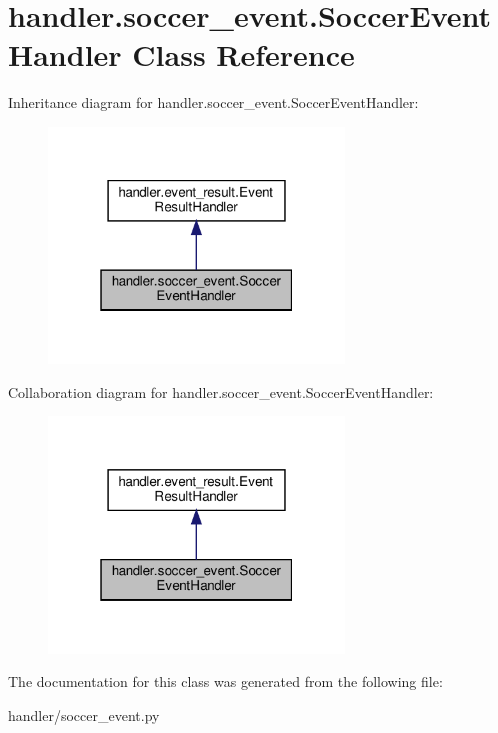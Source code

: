 \hypertarget{classhandler_1_1soccer__event_1_1_soccer_event_handler}{}\section{handler.\+soccer\+\_\+event.\+Soccer\+Event\+Handler Class Reference}
\label{classhandler_1_1soccer__event_1_1_soccer_event_handler}


Inheritance diagram for handler.\+soccer\+\_\+event.\+Soccer\+Event\+Handler\+:\nopagebreak
\begin{figure}[H]
\begin{center}
\leavevmode
\includegraphics[width=223pt]{classhandler_1_1soccer__event_1_1_soccer_event_handler__inherit__graph}
\end{center}
\end{figure}


Collaboration diagram for handler.\+soccer\+\_\+event.\+Soccer\+Event\+Handler\+:\nopagebreak
\begin{figure}[H]
\begin{center}
\leavevmode
\includegraphics[width=223pt]{classhandler_1_1soccer__event_1_1_soccer_event_handler__coll__graph}
\end{center}
\end{figure}


The documentation for this class was generated from the following file\+:\begin{DoxyCompactItemize}
\item 
handler/soccer\+\_\+event.\+py\end{DoxyCompactItemize}
